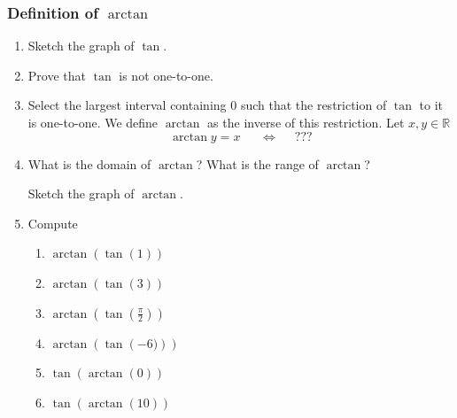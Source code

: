 \documentclass[14pt]{beamer}
\begin{document}
	\begin{frame}[t]
		\fontsize{13}{13}\selectfont
		\frametitle{Definition of $\arctan$}

		\begin{enumerate}
			\item Sketch the graph of $\tan$.

			\item Prove that $\tan$ is not one-to-one.

			\item Select the largest interval containing $0$ such that the restriction
				of $\tan$ to it is one-to-one. We define $\arctan$ as the inverse of
				this restriction. \quad Let $x, y \in \mathbb{R}$
				\[
					\arctan y = x \; \quad \; \iff \; \quad ???
				\]

			\item What is the domain of $\displaystyle \arctan$? What is the range of
				$\displaystyle \arctan$?

				Sketch the graph of $\arctan$.

			\item Compute
				\begin{multicols}{2}
					\begin{enumerate}
						\item $\displaystyle \arctan \left( \tan \left( 1 \right) \right)$

						\item $\displaystyle \arctan \left( \tan \left( 3\right) \right)$

						\item $\displaystyle \arctan \left( \tan \left( \frac{\pi}{2}\right)
							\right)$

						\item $\displaystyle \arctan \left( \tan \left( -6)\right) \right)$

						\item $\displaystyle \tan \left( \arctan \left( 0\right) \right)$

						\item $\displaystyle \tan \left( \arctan \left( 10\right) \right)$
					\end{enumerate}
				\end{multicols}
		\end{enumerate}
	\end{frame}
\end{document}
